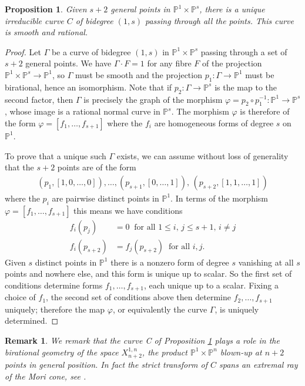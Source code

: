 \documentclass[a4paper,11pt]{article}
\newtheorem{proposition}[theorem]{Proposition}
\newtheorem{remark}[theorem]{Remark}
\newcommand{\PP}{\mathbb P}
\newcommand{\arrow}{\rightarrow}
\begin{document}
 \begin{proposition}\label{prop-rational-curve} Given $s+2$ general points in $\PP^1 \times \PP^s$, there is a unique irreducible curve $C$ of bidegree $(1,s)$ passing through all the points. This curve is smooth and rational.
  \end{proposition}
  \begin{proof}
Let $\Gamma$ be a curve of bidegree $(1,s)$ in $\PP^1 \times \PP^s$ passing through a set of $s+2$ general points. We have $\Gamma \cdot F=1$ for any fibre $F$ of the projection $\PP^1 \times \PP^s \arrow \PP^1$, so $\Gamma$ must be smooth and the projection $p_1 \colon \Gamma \arrow \PP^1$ must be birational, hence an isomorphism. Note that if $p_2 \colon \Gamma \arrow \PP^s$ is the map to the second factor, then $\Gamma$ is precisely the graph of the morphism $\varphi = p_2 \circ p_1^{-1} \colon \PP^1 \arrow \PP^s$, whose image is a rational normal curve in $\PP^s$. The morphism $\varphi$ is therefore of the form $\varphi=\left[f_1,\ldots,f_{s+1}\right]$ where the $f_i$ are homogeneous forms of degree $s$ on $\PP^1$.
    
    To prove that a unique such $\Gamma$ exists, we can assume without loss of generality that the $s+2$ points are of the form
    \begin{align*}
      \left(p_1, [1,0,\ldots,0]\right),\ldots,\left(p_{s+1},[0,\ldots,1]\right), \, \left(p_{s+2},[1,1,\ldots,1]\right) 
    \end{align*}
    where the $p_i$ are pairwise distinct points in $\PP^1$. In terms of the morphism $\varphi=\left[f_1,\ldots,f_{s+1}\right]$ this means we have conditions
    \begin{align*}
      f_i(p_j) &=0 \ \text{ for all } 1 \leq i, \, j \leq s+1, \, i \neq j\\
        f_i(p_{s+2}) &= f_j(p_{s+2}) \ \text{ for all } i,j.
    \end{align*}
Given $s$ distinct points in $\PP^1$ there is a nonzero form of degree $s$ vanishing at all $s$ points and nowhere else, and this form is unique up to scalar. So the first set of conditions determine forms $f_1,\ldots,f_{s+1}$, each unique up to a scalar. Fixing a choice of $f_1$, the second set of conditions above then determine $f_2,\ldots,f_{s+1}$ uniquely; therefore the map $\varphi$, or equivalently the curve $\Gamma$, is uniquely determined. 
  \end{proof}
  \begin{remark}
 We remark that the curve  C of Proposition \ref{prop-rational-curve} plays a role in the birational geometry of the space $X^{1,n}_{n+2}$, the product $\PP^1\times\PP^n$ blown-up at $n+2$ points in general position. In fact the strict transform of $C$  spans an extremal ray of the Mori cone, see \cite[Proposition 3.2]{bolognesi2023cox}.
  \end{remark}
\end{document}
